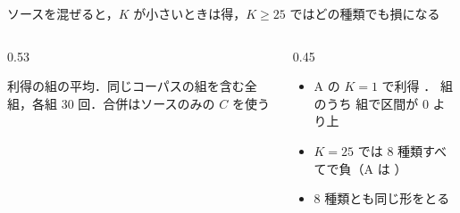 \begin{frame}{ソースを混ぜると，$K$ が小さいときは得，$K \ge 25$ ではどの種類でも損になる}
\begin{columns}[T,onlytextwidth]
\begin{column}{0.53\textwidth}
\begin{tikzpicture}
      \end{tikzpicture}\par
      {\raggedright\tiny 利得の組の平均．同じコーパスの組を含む全組，各組 30 回．合併はソースのみの $C$ を使う\par}
    \end{column}
    \begin{column}{0.45\textwidth}
      \begin{itemize}\footnotesize\setlength{\itemsep}{10pt}
        \item A の $K=1$ で利得  \pt． 組のうち  組で区間が 0 より上
        \item $K=25$ では 8 種類すべてで負（A は  \pt）
        \item 8 種類とも同じ形をとる
      \end{itemize}
    \end{column}
  \end{columns}
\end{frame}

